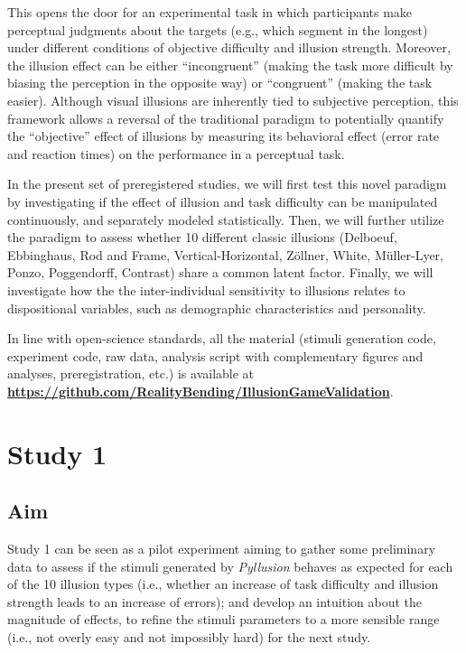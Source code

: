 \documentclass[
  man,floatsintext]{apa6}
\begin{document}
This opens the door for an experimental task in which participants make perceptual judgments about the targets (e.g., which segment in the longest) under different conditions of objective difficulty and illusion strength. Moreover, the illusion effect can be either ``incongruent'' (making the task more difficult by biasing the perception in the opposite way) or ``congruent'' (making the task easier). Although visual illusions are inherently tied to subjective perception, this framework allows a reversal of the traditional paradigm to potentially quantify the ``objective'' effect of illusions by measuring its behavioral effect (error rate and reaction times) on the performance in a perceptual task.

In the present set of preregistered studies, we will first test this novel paradigm by investigating if the effect of illusion and task difficulty can be manipulated continuously, and separately modeled statistically. Then, we will further utilize the paradigm to assess whether 10 different classic illusions (Delboeuf, Ebbinghaus, Rod and Frame, Vertical-Horizontal, Zöllner, White, Müller-Lyer, Ponzo, Poggendorff, Contrast) share a common latent factor. Finally, we will investigate how the the inter-individual sensitivity to illusions relates to dispositional variables, such as demographic characteristics and personality.

In line with open-science standards, all the material (stimuli generation code, experiment code, raw data, analysis script with complementary figures and analyses, preregistration, etc.) is available at \href{https://github.com/RealityBending/IllusionGameValidation}{\textbf{https://github.com/RealityBending/IllusionGameValidation}}.

\hypertarget{study-1}{%
\section{Study 1}\label{study-1}}

\hypertarget{aim}{%
\subsection{Aim}\label{aim}}

Study 1 can be seen as a pilot experiment aiming to gather some preliminary data to assess if the stimuli generated by \emph{Pyllusion} behaves as expected for each of the 10 illusion types (i.e., whether an increase of task difficulty and illusion strength leads to an increase of errors); and develop an intuition about the magnitude of effects, to refine the stimuli parameters to a more sensible range (i.e., not overly easy and not impossibly hard) for the next study.
\end{document}
